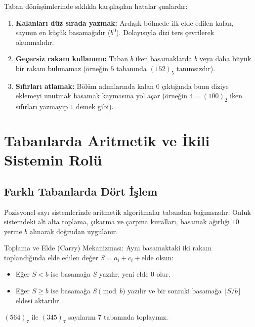 \begin{example}
Taban dönüşümlerinde sıklıkla karşılaşılan hatalar şunlardır:
\begin{enumerate}
    \item \textbf{Kalanları düz sırada yazmak:} Ardışık bölmede ilk elde edilen kalan, sayının en küçük basamağıdır ($b^0$). Dolayısıyla dizi ters çevrilerek okunmalıdır.
    \item \textbf{Geçersiz rakam kullanımı:} Taban $b$ iken basamaklarda $b$ veya daha büyük bir rakam bulunamaz (örneğin $5$ tabanında $(152)_5$ tanımsızdır).
    \item \textbf{Sıfırları atlamak:} Bölüm adımlarında kalan $0$ çıktığında bunu diziye eklemeyi unutmak basamak kaymasına yol açar (örneğin $4 = (100)_2$ iken sıfırları yazmayıp $1$ demek gibi).
\end{enumerate}
\end{example}

\section{Tabanlarda Aritmetik ve İkili Sistemin Rolü}

\subsection{Farklı Tabanlarda Dört İşlem}

Pozisyonel sayı sistemlerinde aritmetik algoritmalar tabandan bağımsızdır: Onluk sistemdeki alt alta toplama, çıkarma ve çarpma kuralları, basamak ağırlığı $10$ yerine $b$ alınarak doğrudan uygulanır.

Toplama ve Elde (Carry) Mekanizması:
Aynı basamaktaki iki rakam toplandığında elde edilen değer $S = a_i + c_i + \text{elde}$ olsun:
\begin{itemize}
    \item Eğer $S < b$ ise basamağa $S$ yazılır, yeni elde $0$ olur.
    \item Eğer $S \ge b$ ise basamağa $S \pmod b$ yazılır ve bir sonraki basamağa $\lfloor S / b \rfloor$ eldesi aktarılır.
\end{itemize}

\begin{example}
$(564)_7$ ile $(345)_7$ sayılarını $7$ tabanında toplayınız.
\end{example}

